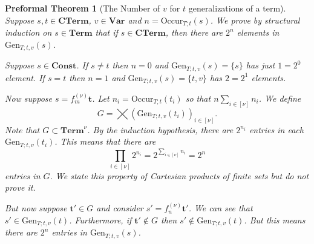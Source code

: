 \documentclass[oneside, 12pt]{book}
\theoremstyle{break}
\newtheorem{preformal definition}[definition]{Preformal Definition}
\newtheorem{preformal theorem}[theorem]{Preformal Theorem}
\newcommand{\bv}[1]{\boldsymbol{#1}}
\begin{document}
		\begin{preformal theorem}[The Number of $v$ for $t$ generalizations of a term]
			Suppose $s, t \in \textbf{CTerm}$, $v\in \textbf{Var}$ and $n = \text{Occur}_{T; t}(s)$.
			We prove by structural induction on $s\in \textbf{Term}$ that if $s\in \textbf{CTerm}$, then there are $2^n$ elements in $\text{Gen}_{T;t, v}(s)$.
			
			Suppose $s\in \textbf{Const}$.
			If $s\neq t$ then $n=0$ and $\text{Gen}_{T;t, v}(s) = \{s\}$ has just $1=2^0$ element.
			If $s=t$ then $n=1$ and $\text{Gen}_{T;t, v}(s) = \{t, v\}$ has $2=2^1$ elements.
			
			Now suppose $s = f_m^{(\nu)}\bv{t}$.
			Let $n_i = \text{Occur}_{T; t}(t_i)$ so that $n \sum_{i\in [\nu]} n_i$.
			We define
			\begin{equation*}
				G = \bigtimes (\text{Gen}_{T;t , v}(t_i))_{i\in [\nu]}.
			\end{equation*}
			Note that $G \subset \textbf{Term}^{\nu}$.
			By the induction hypothesis, there are $2^{n_i}$ entries in each $\text{Gen}_{T; t, v}(t_i)$.
			This means that there are 
			\begin{equation*}
				\prod_{i\in [\nu]} 2^{n_i} = 2^{\sum_{i\in [\nu]} n_i} = 2^n
			\end{equation*}
			entries in $G$.
			We state this property of Cartesian products of finite sets but do not prove it.
			
			But now suppose $\bv{t}' \in G$ and consider $s' = f_n^{(\nu)}\bv{t}'$.
			We can see that $s' \in \text{Gen}_{T;t, v}(t)$.
			Furthermore, if $\bv{t}'\not \in G$ then $s' \not \in \text{Gen}_{T;t, v}(t)$.
			But this means there are $2^n$ entries in $\text{Gen}_{T;t, v}(s)$.
		\end{preformal theorem}
		
\end{document}
